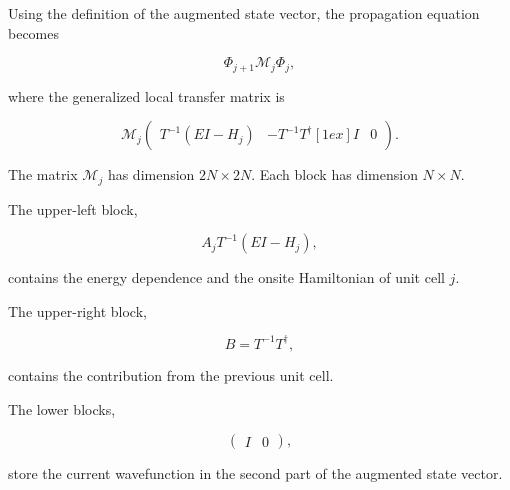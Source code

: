 Using the definition of the augmented state vector, the propagation
equation becomes

\begin{equation}
	\Phi_{j+1}
	\mathcal{M}_j\Phi_j,
	\label{eq:general-transfer-relation}
\end{equation}

where the generalized local transfer matrix is

\begin{equation}
	\mathcal{M}_j
	\begin{pmatrix}

		T^{-1}(EI-H_j)
		 &
		-

		T^{-1}T^\dagger
		[1ex]
		I
		 &
		0
	\end{pmatrix}.
	\label{eq:general-local-transfer-matrix}
\end{equation}

The matrix $\mathcal{M}_j$ has dimension $2N \times 2N$. Each block has
dimension $N \times N$.

The upper-left block,

\begin{equation}
	A_j
	T^{-1}(EI-H_j),
	\label{eq:transfer-block-a}
\end{equation}

contains the energy dependence and the onsite Hamiltonian of unit cell
$j$.

The upper-right block,

\begin{equation}
	B
	=
	T^{-1}T^\dagger,
	\label{eq:transfer-block-b}
\end{equation}

contains the contribution from the previous unit cell.

The lower blocks,

\begin{equation}
	\begin{pmatrix}
		I & 0
	\end{pmatrix},
\end{equation}

store the current wavefunction in the second part of the augmented state
vector.


